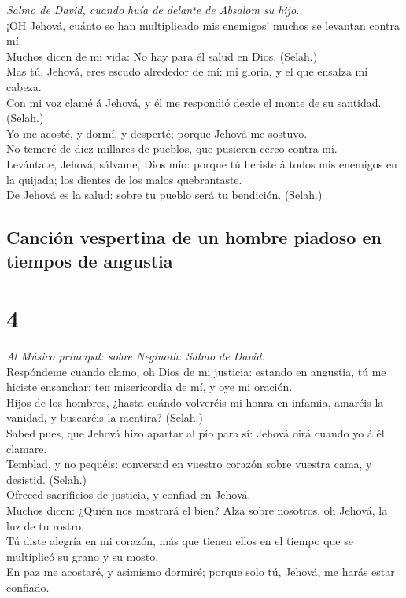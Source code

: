  \emph{Salmo de David, cuando huía de delante de Absalom su
hijo.}\\
¡OH Jehová, cuánto se han multiplicado mis enemigos! muchos se levantan
contra mí.\\
 Muchos dicen de mi vida: No hay para él salud en Dios.
(Selah.)\\
 Mas tú, Jehová, eres escudo alrededor de mí: mi gloria, y
el que ensalza mi cabeza.\\
 Con mi voz clamé á Jehová, y él me respondió desde el monte
de su santidad. (Selah.)\\
 Yo me acosté, y dormí, y desperté; porque Jehová me
sostuvo.\\
 No temeré de diez millares de pueblos, que pusieren cerco
contra mí.\\
 Levántate, Jehová; sálvame, Dios mío: porque tú heriste á
todos mis enemigos en la quijada; los dientes de los malos
quebrantaste.\\
 De Jehová es la salud: sobre tu pueblo será tu bendición.
(Selah.)

\hypertarget{canciuxf3n-vespertina-de-un-hombre-piadoso-en-tiempos-de-angustia}{%
\subsection{Canción vespertina de un hombre piadoso en tiempos de
angustia}\label{canciuxf3n-vespertina-de-un-hombre-piadoso-en-tiempos-de-angustia}}

\hypertarget{section-3}{%
\section{4}\label{section-3}}

 \emph{Al Músico principal: sobre Neginoth: Salmo de
David.}\\
Respóndeme cuando clamo, oh Dios de mi justicia: estando en angustia, tú
me hiciste ensanchar: ten misericordia de mí, y oye mi oración.\\
 Hijos de los hombres, ¿hasta cuándo volveréis mi honra en
infamia, amaréis la vanidad, y buscaréis la mentira? (Selah.)\\
 Sabed pues, que Jehová hizo apartar al pío para sí: Jehová
oirá cuando yo á él clamare.\\
 Temblad, y no pequéis: conversad en vuestro corazón sobre
vuestra cama, y desistid. (Selah.)\\
 Ofreced sacrificios de justicia, y confiad en Jehová.\\
 Muchos dicen: ¿Quién nos mostrará el bien? Alza sobre
nosotros, oh Jehová, la luz de tu rostro.\\
 Tú diste alegría en mi corazón, más que tienen ellos en el
tiempo que se multiplicó su grano y su mosto.\\
 En paz me acostaré, y asimismo dormiré; porque solo tú,
Jehová, me harás estar confiado.

